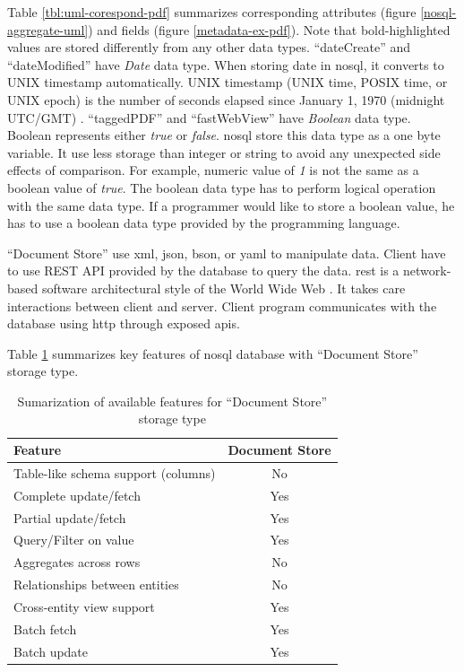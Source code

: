 Table \ref{tbl:uml-corespond-pdf} summarizes corresponding attributes (figure \ref{nosql-aggregate-uml}) and fields (figure \ref{metadata-ex-pdf}).
Note that bold-highlighted values are stored differently from any other data types.
\enquote{dateCreate} and \enquote{dateModified} have \textit{Date} data type.
When storing date in \gls{nosql}, it converts to UNIX timestamp automatically.
UNIX timestamp (UNIX time, POSIX time, or UNIX epoch) is the number of seconds elapsed since January 1, 1970 (midnight UTC/GMT) \cite{unix-time}.
\enquote{taggedPDF} and \enquote{fastWebView} have \textit{Boolean} data type.
Boolean represents either \textit{true} or \textit{false}.
\gls{nosql} store this data type as a one byte variable.
It use less storage than integer or string to avoid any unexpected side effects of comparison. 
For example, numeric value of \textit{1} is not the same as a boolean value of \textit{true}.
The boolean data type has to perform logical operation with the same data type.
If a programmer would like to store a boolean value, he has to use a boolean data type provided by the programming language.

\enquote{Document Store} use \gls{xml}, \gls{json}, \gls{bson}, or \gls{yaml} to manipulate data.
Client have to use REST API provided by the database to query the data.
\gls{rest} is a network-based software architectural style of the World Wide Web \cite{doglio, masse_2012}.
It takes care interactions between client and server.
Client program communicates with the database using \gls{http} through exposed \glspl{api}.

Table \ref{tbl:doctype-storage-feature} summarizes key features of \gls{nosql} database with \enquote{Document Store} storage type.
\begin{table}[h]
	\centering
	\begin{tabular}{l c}
		\hline
		Feature                             &      Document Store \\
		\hline
		Table-like schema support (columns) &      No \\
		Complete update/fetch               &      Yes \\
		Partial update/fetch                &      Yes \\
		Query/Filter on	value               &      Yes \\
		Aggregates across rows              &      No \\
		Relationships between entities      &      No \\
		Cross-entity view support           &      Yes \\
		Batch fetch                         &      Yes \\
		Batch update                        &      Yes \\
		\hline
	\end{tabular}
	\caption{Sumarization of available features for \enquote{Document Store} storage type  \cite{vaish_2013}}
	\label{tbl:doctype-storage-feature}
\end{table}

